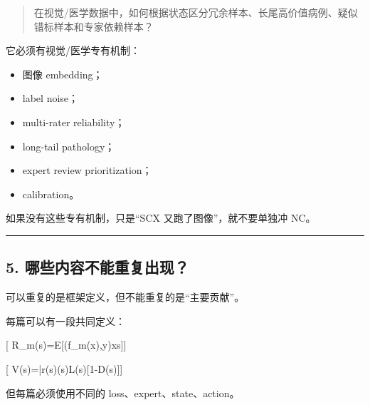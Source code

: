 \documentclass[
  12pt,
]{ctexart}
\providecommand{\tightlist}{%
  \setlength{\itemsep}{0pt}\setlength{\parskip}{0pt}}
\begin{document}
\begin{quote}
在视觉/医学数据中，如何根据状态区分冗余样本、长尾高价值病例、疑似错标样本和专家依赖样本？
\end{quote}

它必须有视觉/医学专有机制：

\begin{itemize}
\tightlist
\item
  图像 embedding；
\item
  label noise；
\item
  multi-rater reliability；
\item
  long-tail pathology；
\item
  expert review prioritization；
\item
  calibration。
\end{itemize}

如果没有这些专有机制，只是``SCX 又跑了图像''，就不要单独冲 NC。

\begin{center}\rule{0.5\linewidth}{0.5pt}\end{center}

\subsection{5.
哪些内容不能重复出现？}\label{ux54eaux4e9bux5185ux5bb9ux4e0dux80fdux91cdux590dux51faux73b0}

可以重复的是框架定义，但不能重复的是``主要贡献''。

每篇可以有一段共同定义：

{[} R\_m(s)=\mathbb E{[}\ell(f\_m(x),y)\mid x\in s{]}{]}

{[} V(s)=\bar r(s)\rho(s)L(s){[}1-D(s){]}{]}

但每篇必须使用不同的 loss、expert、state、action。
\end{document}
